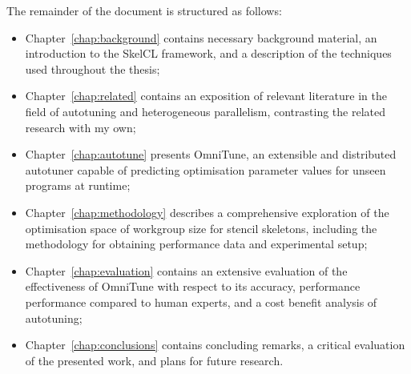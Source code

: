 The remainder of the document is structured as follows:

\begin{itemize}
\item Chapter~\ref{chap:background} contains necessary background
  material, an introduction to the SkelCL framework, and a description
  of the techniques used throughout the thesis;
\item Chapter~\ref{chap:related} contains an exposition of relevant
  literature in the field of autotuning and heterogeneous parallelism,
  contrasting the related research with my own;
\item Chapter~\ref{chap:autotune} presents OmniTune, an extensible and
  distributed autotuner capable of predicting optimisation parameter
  values for unseen programs at runtime;
\item Chapter~\ref{chap:methodology} describes a comprehensive
  exploration of the optimisation space of workgroup size for stencil
  skeletons, including the methodology for obtaining performance data
  and experimental setup;
\item Chapter~\ref{chap:evaluation} contains an extensive evaluation
  of the effectiveness of OmniTune with respect to its accuracy,
  performance performance compared to human experts, and a cost
  benefit analysis of autotuning;
\item Chapter~\ref{chap:conclusions} contains concluding remarks, a
  critical evaluation of the presented work, and plans for future
  research.
\end{itemize}
